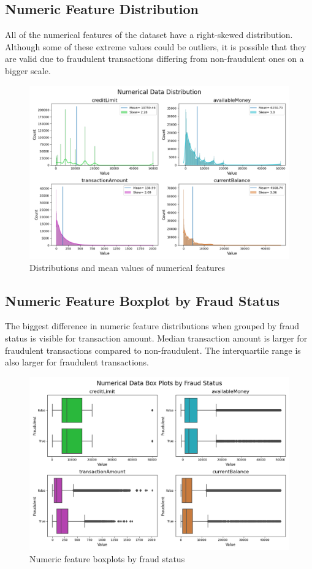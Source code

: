 \documentclass[12pt]{article}
\begin{document}
\subsection{Numeric Feature Distribution}
All of the numerical features of the dataset have a right-skewed distribution. Although some of these extreme values could be outliers, it is possible that they are valid due to fraudulent transactions differing from non-fraudulent ones on a bigger scale.
\begin{figure}[h]
    \centering
    \includegraphics[width=\textwidth]{images/numeric_histograms.png}
    \caption{Distributions and mean values of numerical features}
    \label{fig:numeric_histograms}
\end{figure}

\subsection{Numeric Feature Boxplot by Fraud Status}
The biggest difference in numeric feature distributions when grouped by fraud status is visible for transaction amount. Median transaction amount is larger for fraudulent transactions compared to non-fraudulent. The interquartile range  is also larger for fraudulent transactions.
\begin{figure}[h]
    \centering
    \includegraphics[width=\textwidth]{images/numeric_boxplots_by_fraud.png}
    \caption{Numeric feature boxplots by fraud status}
    \label{fig:my_label}
\end{figure}
\end{document}
